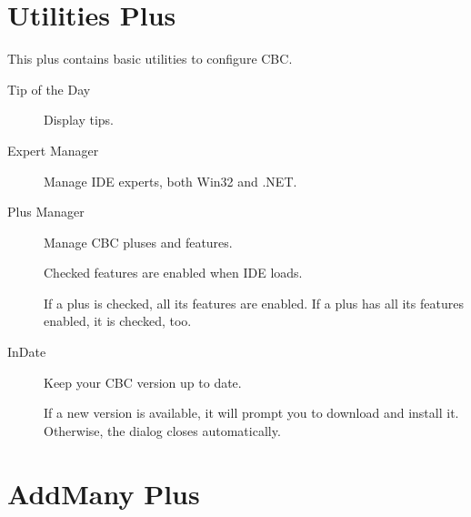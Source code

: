 \section{Utilities Plus}

This plus contains basic utilities to configure CBC.

\begin{description}
\item[Tip of the Day] Display tips.


\item[Expert Manager] Manage IDE experts, both Win32 and .NET.


\item[Plus Manager] Manage CBC pluses and features.


Checked features are enabled when IDE loads.

If a plus is checked, all its features are enabled. If a plus has all its
features enabled, it is checked, too.



%
%
%

\item[InDate] Keep your CBC version up to date.

If a new version is available, it will prompt you to download and install it.
Otherwise, the dialog closes automatically.



\end{description}

\section{AddMany Plus}

